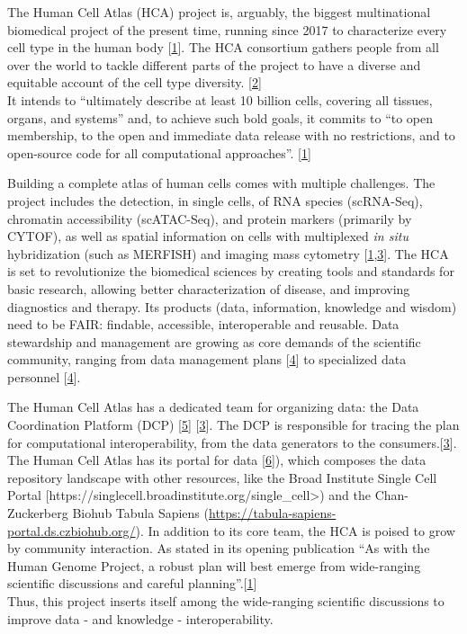 The Human Cell Atlas (HCA) project is, arguably, the biggest multinational biomedical project of the present time, running since 2017 to characterize every cell type in the human body {[}\protect\hyperlink{ref-1GmbExweg}{1}{]}.
The HCA consortium gathers people from all over the world to tackle different parts of the project to have a diverse and equitable account of the cell type diversity. {[}\protect\hyperlink{ref-tjdjR2Xf}{2}{]}\\
It intends to ``ultimately describe at least 10 billion cells, covering all tissues, organs, and systems'' and, to achieve such bold goals, it commits to ``to open membership, to the open and immediate data release with no restrictions, and to open-source code for all computational approaches''. {[}\protect\hyperlink{ref-1GmbExweg}{1}{]}

Building a complete atlas of human cells comes with multiple challenges.
The project includes the detection, in single cells, of RNA species (scRNA-Seq), chromatin accessibility (scATAC-Seq), and protein markers (primarily by CYTOF), as well as spatial information on cells with multiplexed \emph{in situ} hybridization (such as MERFISH) and imaging mass cytometry {[}\protect\hyperlink{ref-1GmbExweg}{1},\protect\hyperlink{ref-kkwRTArg}{3}{]}.
The HCA is set to revolutionize the biomedical sciences by creating tools and standards for basic research, allowing better characterization of disease, and improving diagnostics and therapy.
Its products (data, information, knowledge and wisdom) need to be FAIR: findable, accessible, interoperable and reusable.
Data stewardship and management are growing as core demands of the scientific community, ranging from data management plans {[}\protect\hyperlink{ref-1DSEIjFha}{4}{]} to specialized data personnel {[}\protect\hyperlink{ref-1DSEIjFha}{4}{]}.

The Human Cell Atlas has a dedicated team for organizing data: the Data Coordination Platform (DCP) {[}\protect\hyperlink{ref-zDRzmIGu}{5}{]} {[}\protect\hyperlink{ref-kkwRTArg}{3}{]}.
The DCP is responsible for tracing the plan for computational interoperability, from the data generators to the consumers.{[}\protect\hyperlink{ref-kkwRTArg}{3}{]}.
The Human Cell Atlas has its portal for data {[}\protect\hyperlink{ref-kX6KnbUo}{6}{]}), which composes the data repository landscape with other resources, like the Broad Institute Single Cell Portal {[}https://singlecell.broadinstitute.org/single\_cell\textgreater) and the Chan-Zuckerberg Biohub Tabula Sapiens (\url{https://tabula-sapiens-portal.ds.czbiohub.org/}).
In addition to its core team, the HCA is poised to grow by community interaction.
As stated in its opening publication ``As with the Human Genome Project, a robust plan will best emerge from wide-ranging scientific discussions and careful planning''.{[}\protect\hyperlink{ref-1GmbExweg}{1}{]}\\
Thus, this project inserts itself among the wide-ranging scientific discussions to improve data - and knowledge - interoperability.


